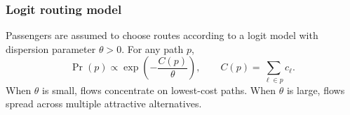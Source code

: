 \subsubsection{Logit routing model}

Passengers are assumed to choose routes according to a logit model with dispersion parameter $\theta>0$.
For any path $p$,
\[
\Pr(p) \propto \exp\!\left(-\frac{C(p)}{\theta}\right),
\qquad
C(p)=\sum_{\ell\in p}c_\ell.
\]
When $\theta$ is small, flows concentrate on lowest-cost paths.
When $\theta$ is large, flows spread across multiple attractive alternatives.

